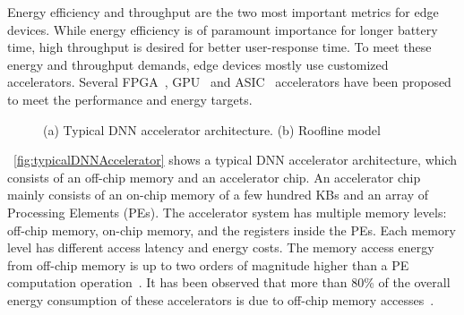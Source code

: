 \documentclass[a4paper,10pt]{article}
\begin{document}
Energy efficiency and throughput are the two most important metrics for edge devices. While energy efficiency is of paramount importance for longer battery time, high throughput is desired for better user-response time. To meet these energy and throughput demands, edge devices mostly use customized accelerators. Several FPGA~\cite{zhang2015optimizing,wei2019overcoming,gokhale2014240,8742284,gupta2015deep,alwani2016fused}, GPU~\cite{chetlur2014cudnn} and ASIC~\cite{Chen2016EyerissAS,chen2014diannao,chen2014dadiannao,du2015shidiannao} accelerators have been proposed to meet the performance and energy targets. 
\begin{figure}[!htb]
	\centering
    \captionsetup{font=sf}
	\hfil
	\caption{(a) Typical DNN accelerator architecture. (b) Roofline model}
	\label{fig:acceleratorAndRoofline}
\end{figure}

\figurename{~\ref{fig:typicalDNNAccelerator}} shows a typical DNN accelerator architecture, which consists of an off-chip memory and an accelerator chip. An accelerator chip mainly consists of an on-chip memory of a few hundred KBs and an array of Processing Elements (PEs). The accelerator system has multiple memory levels: off-chip memory, on-chip memory, and the registers inside the PEs. Each memory level has different access latency and energy costs. The memory access energy from off-chip memory is up to two orders of magnitude higher than a PE computation operation~\cite{Chen2016EyerissAS}. It has been observed that more than 80\% of the overall energy consumption of these accelerators is due to off-chip memory accesses~\cite{chen2014diannao}. 
\end{document}
